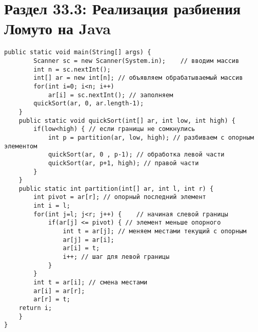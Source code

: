 \section*{Раздел 33.3: Реализация разбиения Ломуто на Java}
\begin{tcolorbox}
\begin{verbatim}
public static void main(String[] args) {
		Scanner sc = new Scanner(System.in);	// вводим массив
		int n = sc.nextInt();
		int[] ar = new int[n]; // объявляем обрабатываемый массив
		for(int i=0; i<n; i++)
			ar[i] = sc.nextInt(); // заполняем
		quickSort(ar, 0, ar.length-1);
	}
	public static void quickSort(int[] ar, int low, int high) {
		if(low<high) { // если границы не сомкнулись
			int p = partition(ar, low, high); // разбиваем с опорным элементом
			quickSort(ar, 0 , p-1); // обработка левой части
			quickSort(ar, p+1, high); // правой части
		}
	}
	public static int partition(int[] ar, int l, int r) {
		int pivot = ar[r]; // опорный последний элемент
		int i = l;
		for(int j=l; j<r; j++) {	// начиная слевой границы
			if(ar[j] <= pivot) { // элемент меньше опорного
				int t = ar[j]; // меняем местами текущий с опорным
				ar[j] = ar[i];
				ar[i] = t;
				i++; // шаг для левой границы
			}
		}
		int t = ar[i]; // смена местами
		ar[i] = ar[r];
		ar[r] = t;
	return i;
	}
}
\end{verbatim}
\end{tcolorbox}














